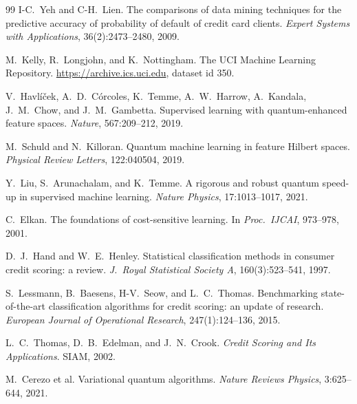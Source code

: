 \documentclass[11pt]{article}
\begin{document}
\begin{thebibliography}{99}\small
{} I-C.~Yeh and C-H.~Lien.
The comparisons of data mining techniques for the predictive accuracy of
probability of default of credit card clients.
\emph{Expert Systems with Applications}, 36(2):2473--2480, 2009.

 M.~Kelly, R.~Longjohn, and K.~Nottingham.
The UCI Machine Learning Repository. \url{https://archive.ics.uci.edu},
dataset id 350.

 V.~Havl\'i\v{c}ek, A.~D.~C\'orcoles, K.~Temme,
A.~W.~Harrow, A.~Kandala, J.~M.~Chow, and J.~M.~Gambetta.
Supervised learning with quantum-enhanced feature spaces.
\emph{Nature}, 567:209--212, 2019.

 M.~Schuld and N.~Killoran.
Quantum machine learning in feature Hilbert spaces.
\emph{Physical Review Letters}, 122:040504, 2019.

 Y.~Liu, S.~Arunachalam, and K.~Temme.
A rigorous and robust quantum speed-up in supervised machine learning.
\emph{Nature Physics}, 17:1013--1017, 2021.

 C.~Elkan.
The foundations of cost-sensitive learning.
In \emph{Proc.\ IJCAI}, 973--978, 2001.

 D.~J.~Hand and W.~E.~Henley.
Statistical classification methods in consumer credit scoring: a review.
\emph{J.\ Royal Statistical Society A}, 160(3):523--541, 1997.

 S.~Lessmann, B.~Baesens, H-V.~Seow, and L.~C.~Thomas.
Benchmarking state-of-the-art classification algorithms for credit scoring:
an update of research.
\emph{European Journal of Operational Research}, 247(1):124--136, 2015.

 L.~C.~Thomas, D.~B.~Edelman, and J.~N.~Crook.
\emph{Credit Scoring and Its Applications}. SIAM, 2002.

 M.~Cerezo et al.
Variational quantum algorithms.
\emph{Nature Reviews Physics}, 3:625--644, 2021.
\end{thebibliography}
\end{document}
